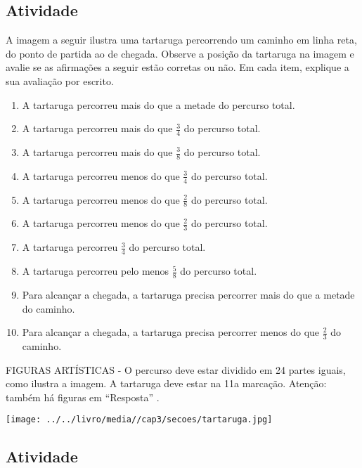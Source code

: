 \subsection{Atividade}

A imagem a seguir ilustra uma tartaruga percorrendo um caminho em linha reta, do ponto de partida ao de chegada. Observe a posição da tartaruga na imagem e avalie se as afirmações a seguir estão corretas ou não. Em cada item, explique a sua avaliação por escrito.
\begin{enumerate} [\quad a)] %
  \item     A tartaruga percorreu mais do que a metade do percurso total.
  \item     A tartaruga percorreu mais do que     $\frac{3}{4}$     do percurso total.
  \item     A tartaruga percorreu mais do que     $\frac{3}{8}$     do percurso total.
  \item     A tartaruga percorreu menos do que     $\frac{3}{4}$     do percurso total.
  \item     A tartaruga percorreu menos do que     $\frac{2}{8}$     do percurso total.
  \item     A tartaruga percorreu menos do que     $\frac{2}{3}$     do percurso total.
  \item     A tartaruga percorreu     $\frac{3}{4}$     do percurso total.
  \item     A tartaruga percorreu pelo menos     $\frac{5}{8}$     do percurso total.
  \item     Para alcançar a chegada, a tartaruga precisa percorrer mais do que a metade do caminho.
  \item     Para alcançar a chegada, a tartaruga precisa percorrer menos do que     $\frac{2}{3}$     do caminho.
\end{enumerate} %


\begin{imagem*}[breakable]{}{}   FIGURAS ARTÍSTICAS - O percurso deve estar dividido em 24 partes iguais, como ilustra a imagem. A tartaruga deve estar na 11a marcação. Atenção: também há figuras em   ``Resposta''  .  
  
    \texttt{[image: ../../livro/media//cap3/secoes/tartaruga.jpg]}  
\end{imagem*}

\subsection{Atividade}

